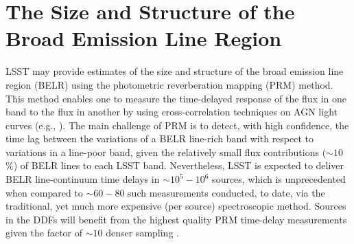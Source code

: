 %
%
%
%
%
%
%

\section{The Size and Structure of the Broad Emission Line Region}
\def\secname{\chpname:photoRM}\label{sec:\secname}




LSST may provide estimates of the size and structure of the broad
emission line region (BELR) using the photometric reverberation
mapping (PRM) method. This method enables one to measure the
time-delayed response of the flux in one band to the flux
in another by using cross-correlation techniques on AGN light
curves (e.g.,
\citealt{CheloucheEtal2014}).
The main challenge of PRM is to detect,
with high confidence, the time lag between the variations of a BELR
line-rich band with respect to variations in a line-poor band, given
the relatively small flux contributions ($\sim10$\%) of BELR lines to each
LSST band. Nevertheless, LSST is expected to deliver BELR line-continuum
time delays in $\sim10^5-10^6$ sources, which is unprecedented when
compared to $\sim60-80$ such measurements conducted, to date, via the
traditional, yet much more expensive (per source) spectroscopic method.
Sources in the DDFs will benefit from the highest
quality PRM time-delay measurements given the factor of $\sim10$ denser
sampling \citep{CheloucheEtal2014}.

